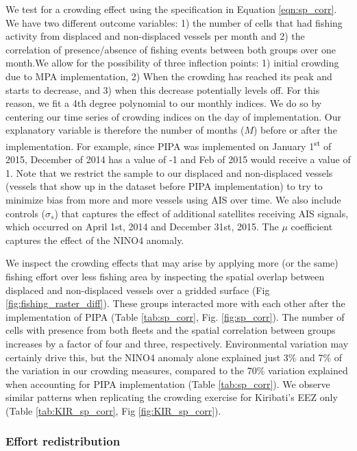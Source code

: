 \documentclass[12pt]{article}
\begin{document}
We test for a crowding effect using the specification in Equation \ref{eqn:sp_corr}. We have two different outcome variables:
1) the number of cells that had fishing activity from displaced and non-displaced vessels per month and 2) the correlation of presence/absence of fishing events between both groups over one month.We allow for the possibility of three inflection points: 1) initial crowding due to MPA implementation, 2) When the crowding has reached its peak and starts to decrease, and 3) when this decrease potentially levels off. For this reason, we fit a 4th degree polynomial to our monthly indices. We do so by centering our time series of crowding indices on the day of implementation. Our explanatory variable is therefore the number of months ($M$) before or after the implementation. For example, since PIPA was implemented on January 1\textsuperscript{st} of 2015, December of 2014 has a value of -1 and Feb of 2015 would receive a value of 1. Note that we restrict the sample to our displaced and non-displaced vessels (vessels that show up in the dataset before PIPA implementation) to try to minimize bias from more and more vessels using AIS over time. We also include controls ($\sigma_s$) that captures the effect of additional satellites receiving AIS signals, which occurred on April 1st, 2014 and December 31st, 2015. The $\mu$ coefficient captures the effect of the NINO4 anomaly.

We inspect the crowding effects that may arise by applying more (or the same) fishing effort over less fishing area by inspecting the spatial overlap between displaced and non-displaced vessels over a gridded surface (Fig \ref{fig:fishing_raster_diff}). These groups interacted more with each other after the implementation of PIPA (Table \ref{tab:sp_corr}, Fig. \ref{fig:sp_corr}). The number of cells with presence from both fleets and the spatial correlation between groups increases by a factor of four and three, respectively. Environmental variation may certainly drive this, but the NINO4 anomaly alone explained just 3\% and 7\% of the variation in our crowding measures, compared to the 70\% variation explained when accounting for PIPA implementation (Table \ref{tab:sp_corr}). We observe similar patterns when replicating the crowding exercise for Kiribati's EEZ only (Table \ref{tab:KIR_sp_corr}, Fig \ref{fig:KIR_sp_corr}).

\subsubsection{Effort redistribution}
\end{document}
